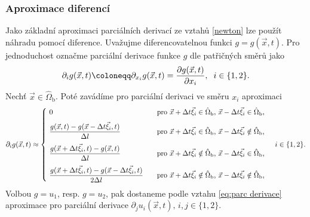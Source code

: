 \subsubsection{\fontsize{11}{15}\selectfont Aproximace diferencí}
Jako základní aproximaci parciálních derivací ze vztahů \eqref{newton} lze použít náhradu pomocí diference. 
Uvažujme diferencovatelnou funkci $ g = g(\vec{x}, t) $. Pro jednoduchost označme parciální derivace funkce $ g $ dle patřičných směrů jako
\begin{equation}
\partial_{i}g(\vec{x}, t) \coloneqq \partial_{x_i} g(\vec{x}, t) = \frac{\partial g(\vec{x}, t)}{\partial {x_i}}, \hspace{2mm} i \in \{1,2\}.
\end{equation}
Nechť $ \vec{x} \in \hat{\Omega}_{\mathrm{b}} $. Poté zavádíme pro parciální derivaci ve směru $ {x_i} $ aproximaci
\begin{equation}\label{eq:parc derivace}
\partial_{i} g(\vec{x}, t)\approx
\begin{dcases*}
	\ 0 & \hspace{2mm} pro $ \vec{x} + \Delta t \vec{\xi}_{i} \in \hat{\Omega}_{\mathrm{b}}$, $ \vec{x} - \Delta t \vec{\xi}_{i} \in \hat{\Omega}_{\mathrm{b}}$,\\[3pt]
	\ \dfrac{g (\vec{x}, t) - g (\vec{x} - \Delta t \vec{\xi}_{i}, t)}{\Delta l} & \hspace{2mm} pro $ \vec{x} + \Delta t \vec{\xi}_{i} \in \hat{\Omega}_{\mathrm{b}}$, $ \vec{x} - \Delta t \vec{\xi}_{i} \notin \hat{\Omega}_{\mathrm{b}}$,\\[3pt]
	\ \dfrac{g (\vec{x} + \Delta t \vec{\xi}_{i}, t) - g (\vec{x}, t)}{\Delta l} & \hspace{2mm} pro $ \vec{x} + \Delta t \vec{\xi}_{i} \notin \hat{\Omega}_{\mathrm{b}}$, $ \vec{x} - \Delta t \vec{\xi}_{i} \in \hat{\Omega}_{\mathrm{b}}$,\\[3pt]
	\ \dfrac{g (\vec{x} + \Delta t \vec{\xi}_{i}, t) - g (\vec{x} - \Delta t \vec{\xi}_{i}, t)}{2\Delta l} & \hspace{2mm} pro $ \vec{x} + \Delta t \vec{\xi}_{i} \notin \hat{\Omega}_{\mathrm{b}}$, $ \vec{x} - \Delta t \vec{\xi}_{i} \notin \hat{\Omega}_{\mathrm{b}}$,
\end{dcases*}
\hspace{3mm}
i \in \{1,2\}.
\end{equation}
Volbou $ g = u_1$, resp. $ g = u_2$, pak dostaneme podle vztahu \eqref{eq:parc derivace} aproximace pro parciální derivace $ \partial_{j} u_{i}(\vec{x}, t), \, i,j \in \{1, 2\}$. 

